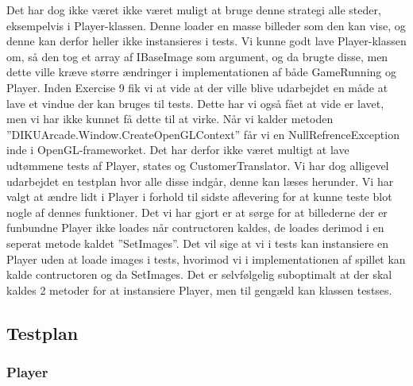    Det har dog ikke været ikke været muligt at bruge denne strategi alle steder, eksempelvis i Player-klassen. Denne loader en masse billeder som den kan vise, og denne kan derfor heller ikke instansieres i tests. Vi kunne godt lave Player-klassen om, så den tog et array af IBaseImage som argument, og da brugte disse, men dette ville kræve større ændringer i implementationen af både GameRunning og Player. Inden Exercise 9 fik vi at vide at der ville blive udarbejdet en måde at lave et vindue der kan bruges til tests. Dette har vi også fået at vide er lavet, men vi har ikke kunnet få dette til at virke. Når vi kalder metoden ''DIKUArcade.Window.CreateOpenGLContext'' får vi en NullRefrenceException inde i OpenGL-frameworket. Det har derfor ikke været multigt at lave udtømmene tests af Player, states og CustomerTranslator. Vi har dog alligevel udarbejdet en testplan hvor alle disse indgår, denne kan læses herunder. Vi har valgt at ændre lidt i Player i forhold til sidste aflevering for at kunne teste blot nogle af dennes funktioner. Det vi har gjort er at sørge for at billederne der er funbundne Player ikke loades når contructoren kaldes, de loades derimod i en seperat metode kaldet ''SetImages''. Det vil sige at vi i tests kan instansiere en Player uden at loade images i tests, hvorimod vi i implementationen af spillet kan kalde contructoren og da SetImages. Det er selvfølgelig suboptimalt at der skal kaldes 2 metoder for at instansiere Player, men til gengæld kan klassen testses. 
\subsection{Testplan}
   \subsubsection{Player}


